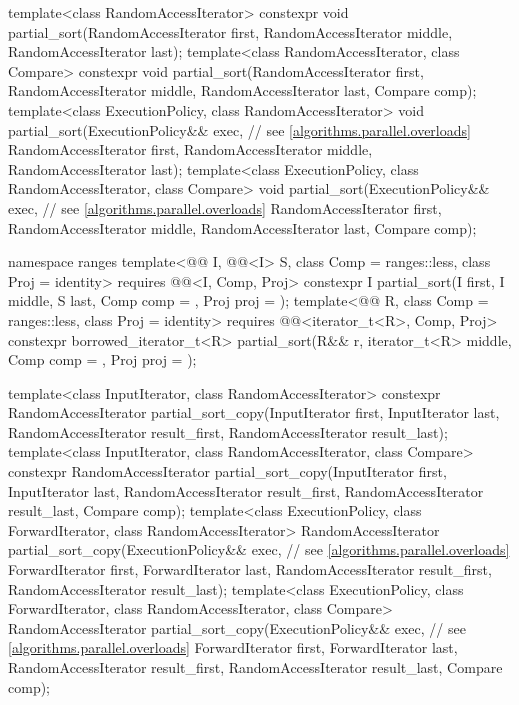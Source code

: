 \begin{codeblock}
{  template<class RandomAccessIterator>
    constexpr void partial_sort(RandomAccessIterator first, RandomAccessIterator middle,
                                RandomAccessIterator last);
  template<class RandomAccessIterator, class Compare>
    constexpr void partial_sort(RandomAccessIterator first, RandomAccessIterator middle,
                                RandomAccessIterator last, Compare comp);
  template<class ExecutionPolicy, class RandomAccessIterator>
    void partial_sort(ExecutionPolicy&& exec,                   // see \ref{algorithms.parallel.overloads}
                      RandomAccessIterator first, RandomAccessIterator middle,
                      RandomAccessIterator last);
  template<class ExecutionPolicy, class RandomAccessIterator, class Compare>
    void partial_sort(ExecutionPolicy&& exec,                   // see \ref{algorithms.parallel.overloads}
                      RandomAccessIterator first, RandomAccessIterator middle,
                      RandomAccessIterator last, Compare comp);

  namespace ranges {
    template<@@ I, @@<I> S, class Comp = ranges::less,
             class Proj = identity>
      requires @@<I, Comp, Proj>
      constexpr I
        partial_sort(I first, I middle, S last, Comp comp = {}, Proj proj = {});
    template<@@ R, class Comp = ranges::less, class Proj = identity>
      requires @@<iterator_t<R>, Comp, Proj>
      constexpr borrowed_iterator_t<R>
        partial_sort(R&& r, iterator_t<R> middle, Comp comp = {},
                     Proj proj = {});
  }

  template<class InputIterator, class RandomAccessIterator>
    constexpr RandomAccessIterator
      partial_sort_copy(InputIterator first, InputIterator last,
                        RandomAccessIterator result_first,
                        RandomAccessIterator result_last);
  template<class InputIterator, class RandomAccessIterator, class Compare>
    constexpr RandomAccessIterator
      partial_sort_copy(InputIterator first, InputIterator last,
                        RandomAccessIterator result_first,
                        RandomAccessIterator result_last,
                        Compare comp);
  template<class ExecutionPolicy, class ForwardIterator, class RandomAccessIterator>
    RandomAccessIterator
      partial_sort_copy(ExecutionPolicy&& exec,                 // see \ref{algorithms.parallel.overloads}
                        ForwardIterator first, ForwardIterator last,
                        RandomAccessIterator result_first,
                        RandomAccessIterator result_last);
  template<class ExecutionPolicy, class ForwardIterator, class RandomAccessIterator,
           class Compare>
    RandomAccessIterator
      partial_sort_copy(ExecutionPolicy&& exec,                 // see \ref{algorithms.parallel.overloads}
                        ForwardIterator first, ForwardIterator last,
                        RandomAccessIterator result_first,
                        RandomAccessIterator result_last,
                        Compare comp);

}
\end{codeblock}
